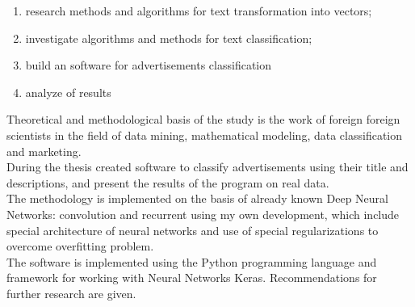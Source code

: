 \begin{enumerate}
	\item research methods and algorithms for text transformation into vectors;
	\item investigate algorithms and methods for text classification;
	\item build an software for advertisements classification
	\item analyze of results 
\end{enumerate}

Theoretical and methodological basis of the study is the work of foreign foreign scientists in the field of data mining, mathematical modeling, data classification and marketing. \\
During the thesis created software to classify advertisements using their title and descriptions, and present the results of the program on real data.\\
The methodology is implemented on the basis of already known Deep Neural Networks: convolution and recurrent using my own development, which include special architecture of neural networks and use of special regularizations to overcome overfitting problem. \\
The software is implemented using the Python programming language and
framework for working with Neural Networks Keras. Recommendations for further research are given. \\
\clearpage
